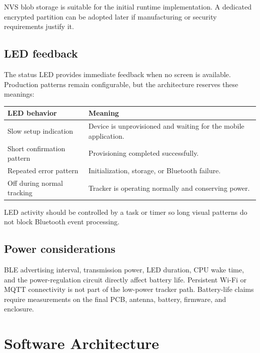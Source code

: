 \documentclass[12pt,a4paper]{article}
\begin{document}
NVS blob storage is suitable for the initial runtime implementation. A
dedicated encrypted partition can be adopted later if manufacturing or security
requirements justify it.

\subsection{LED feedback}

The status LED provides immediate feedback when no screen is available.
Production patterns remain configurable, but the architecture reserves these
meanings:

\begin{table}[ht]
    \centering
    \begin{tabularx}{0.9\textwidth}{p{4.5cm}X}
        \toprule
        \textbf{LED behavior} & \textbf{Meaning} \\
        \midrule
        Slow setup indication &
        Device is unprovisioned and waiting for the mobile application. \\
        Short confirmation pattern &
        Provisioning completed successfully. \\
        Repeated error pattern &
        Initialization, storage, or Bluetooth failure. \\
        Off during normal tracking &
        Tracker is operating normally and conserving power. \\
        \bottomrule
    \end{tabularx}
\end{table}

LED activity should be controlled by a task or timer so long visual patterns do
not block Bluetooth event processing.

\subsection{Power considerations}

BLE advertising interval, transmission power, LED duration, CPU wake time, and
the power-regulation circuit directly affect battery life. Persistent Wi-Fi or
MQTT connectivity is not part of the low-power tracker path. Battery-life
claims require measurements on the final PCB, antenna, battery, firmware, and
enclosure.

\section{Software Architecture}
\end{document}
